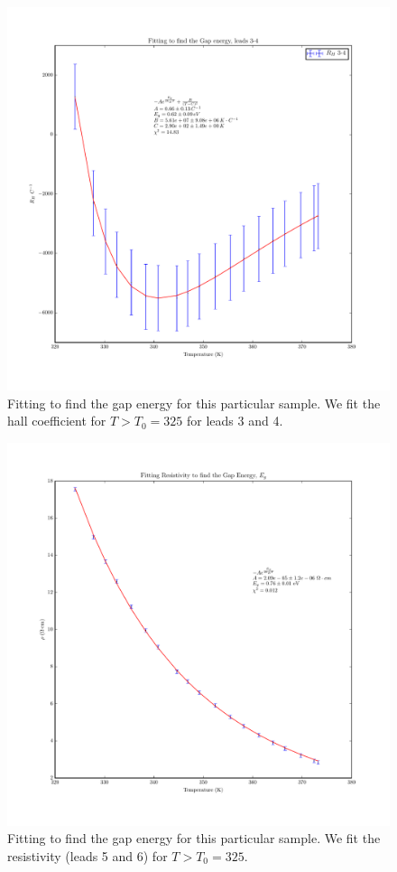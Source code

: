 \documentclass[reprint, nobibnotes, amssymb, amsmath, amsfonts, physics, mathtools, mathrsfs, floatfix]{revtex4-1}
\begin{document}
\begin{widetext}
      \begin{figure}[h]
        \centering
        \includegraphics[width=\linewidth]{../plots/rh_34_eg.pdf}
        \caption{Fitting to find the gap energy for this particular sample.  We fit the hall coefficient for $T > T_0 = 325$ for leads 3 and 4. \label{rh_34_eg}}
      \end{figure}

      \begin{figure}[h]
        \centering
        \includegraphics[width=\linewidth]{../plots/resistivity_eg.pdf}
        \caption{Fitting to find the gap energy for this particular sample.  We fit the resistivity (leads 5 and 6) for $T > T_0 = 325$. \label{rho_eg}}
      \end{figure}

    \end{widetext}

  
  
\end{document}
